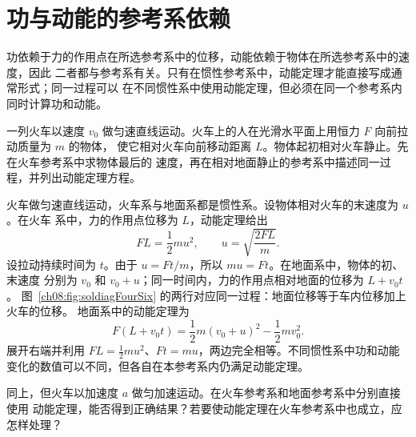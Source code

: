 {\section{功与动能的参考系依赖}

功依赖于力的作用点在所选参考系中的位移，动能依赖于物体在所选参考系中的速度，因此
二者都与参考系有关。只有在惯性参考系中，动能定理才能直接写成通常形式；同一过程可以
在不同惯性系中使用动能定理，但必须在同一个参考系内同时计算功和动能。

\begin{origexamplebox}{}\label{ch08:ex:s10-4-6}
一列火车以速度 $v_0$ 做匀速直线运动。火车上的人在光滑水平面上用恒力 $F$ 向前拉动质量为 $m$ 的物体，
使它相对火车向前移动距离 $L$。物体起初相对火车静止。先在火车参考系中求物体最后的
速度，再在相对地面静止的参考系中描述同一过程，并列出动能定理方程。

\ThQTrain
\end{origexamplebox}

\begin{xesolution}
火车做匀速直线运动，火车系与地面系都是惯性系。设物体相对火车的末速度为 $u$。在火车
系中，力的作用点位移为 $L$，动能定理给出
\[
 FL=\frac12mu^2,
 \qquad
 \boxed{u=\sqrt{\frac{2FL}{m}}}.
\]
设拉动持续时间为 $t$。由于 $u=Ft/m$，所以 $m u=Ft$。在地面系中，物体的初、末速度
分别为 $v_0$ 和 $v_0+u$；同一时间内，力的作用点相对地面的位移为 $L+v_0t$。
\soldiagFourSix
图~\ref{ch08:fig:soldiagFourSix} 的两行对应同一过程：地面位移等于车内位移加上火车的位移。
地面系中的动能定理为
\[
 \boxed{
 F(L+v_0t)
 =\frac12m(v_0+u)^2-\frac12mv_0^2}.
\]
展开右端并利用 $FL=\tfrac12mu^2$、$Ft=mu$，两边完全相等。不同惯性系中功和动能
变化的数值可以不同，但各自在本参考系内仍满足动能定理。
\end{xesolution}

\begin{origexamplebox}{}\label{ch08:ex:s10-4-7}
同上，但火车以加速度 $a$ 做匀加速运动。在火车参考系和地面参考系中分别直接使用
动能定理，能否得到正确结果？若要使动能定理在火车参考系中也成立，应怎样处理？

\ThQAcceleratingTrain
\end{origexamplebox}

}
